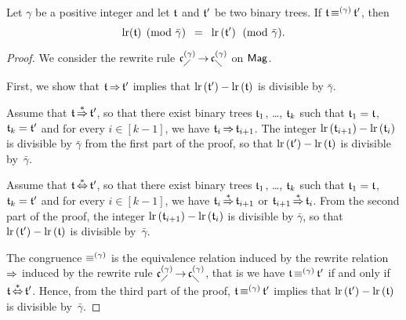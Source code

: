 \begin{Lemma}\label{lem:left_rank_and_CongrCAs}
    Let $\gamma$ be a positive integer and let $\mathfrak{t}$ and
    $\mathfrak{t}'$ be two binary trees. If $\mathfrak{t} \operatorname{\equiv}^{(\gamma)} \mathfrak{t}'$, then
    \begin{equation}
        \mathrm{lr}(\mathfrak{t}) \pmod{\bar{\gamma}}
        \enspace = \enspace
        \mathrm{lr}\left(\mathfrak{t}'\right) \pmod{\bar{\gamma}}.
    \end{equation}
\end{Lemma}
\begin{proof}
  We consider the rewrite rule $\mathfrak{c}^{\left(\gamma\right)}_{\diagup} \operatorname{\to} \mathfrak{c}^{\left(\gamma\right)}_{\diagdown}$ on
  $\mathsf{Mag}$.
    \smallbreak

    First, we show that $\mathfrak{t} \operatorname{\Rightarrow} \mathfrak{t}'$ implies that
    $\mathrm{lr}\left(\mathfrak{t}'\right) - \mathrm{lr}\left(\mathfrak{t}\right)$ is
    divisible by $\bar{\gamma}$. 
    \smallbreak

    Assume that $\mathfrak{t} \operatorname{\overset{\ast}{\operatorname{\Rightarrow}}} \mathfrak{t}'$, so that there exist binary trees
    $\mathfrak{t}_1$, \dots, $\mathfrak{t}_k$ such that $\mathfrak{t}_1 = \mathfrak{t}$,
    $\mathfrak{t}_k = \mathfrak{t}'$ and for every $i \in [k - 1]$, we have
    $\mathfrak{t}_i\operatorname{\Rightarrow} \mathfrak{t}_{i + 1}$. The integer
    \begin{math}
        \mathrm{lr}\left(\mathfrak{t}_{i + 1}\right)
        -
        \mathrm{lr}\left(\mathfrak{t}_i\right)
    \end{math}
    is divisible by $\bar{\gamma}$ from the first part of the proof, so
    that $\mathrm{lr}\left(\mathfrak{t}'\right) - \mathrm{lr}\left(\mathfrak{t}\right)$ is
    divisible by~$\bar{\gamma}$.
    \smallbreak

    Assume that $\mathfrak{t} \operatorname{\overset{\ast}{\Leftrightarrow}} \mathfrak{t}'$, so that there exist binary trees
    $\mathfrak{t}_1$, \dots, $\mathfrak{t}_k$ such that $\mathfrak{t}_1 = \mathfrak{t}$,
    $\mathfrak{t}_k = \mathfrak{t}'$ and for every $i \in [k - 1]$, we have
    $\mathfrak{t}_i \operatorname{\overset{\ast}{\operatorname{\Rightarrow}}} \mathfrak{t}_{i + 1}$ or $\mathfrak{t}_{i + 1} \operatorname{\overset{\ast}{\operatorname{\Rightarrow}}}
    \mathfrak{t}_i$. From the second part of the proof, the integer
    \begin{math}
        \mathrm{lr}\left(\mathfrak{t}_{i + 1}\right)
        -
        \mathrm{lr}\left(\mathfrak{t}_i\right)
    \end{math}
    is divisible by $\bar{\gamma}$, so that
    $\mathrm{lr}\left(\mathfrak{t}'\right) - \mathrm{lr}\left(\mathfrak{t}\right)$ is
    divisible by~$\bar{\gamma}$.
    \smallbreak

    The congruence $\operatorname{\equiv}^{(\gamma)}$ is the equivalence relation
    induced by the rewrite relation $\operatorname{\Rightarrow}$ induced by the rewrite
    rule $\mathfrak{c}^{\left(\gamma\right)}_{\diagup} \operatorname{\to} \mathfrak{c}^{\left(\gamma\right)}_{\diagdown}$, that is we have $\mathfrak{t}
    \operatorname{\equiv}^{(\gamma)} \mathfrak{t}'$ if and only if $\mathfrak{t} \operatorname{\overset{\ast}{\Leftrightarrow}} \mathfrak{t}'$.
    Hence, from the third part of the proof, $\mathfrak{t} \operatorname{\equiv}^{(\gamma)}
    \mathfrak{t}'$ implies that
    \begin{math}
        \mathrm{lr}\left(\mathfrak{t}'\right) - \mathrm{lr}\left(\mathfrak{t}\right)
    \end{math}
    is divisible by~$\bar{\gamma}$.
\end{proof}
\medbreak

